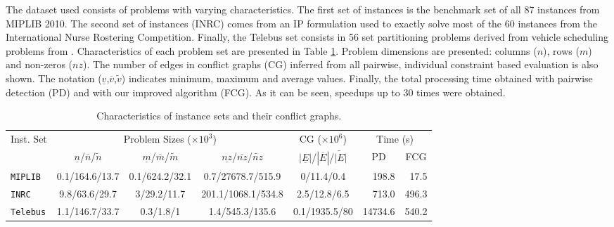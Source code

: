\documentclass{endm}
\begin{document}
The dataset used consists of problems with varying characteristics. The first set of instances is the benchmark set of all 87 instances from MIPLIB 2010\cite{miplib}. The second set of instances (INRC) comes from an IP formulation  used to exactly solve \cite{Santos2014} most of the 60 instances from the International Nurse Rostering Competition\cite{haspeslagh}. Finally, the Telebus set consists in 56 set partitioning problems derived from vehicle scheduling problems from \cite{Borndorfer1998}. Characteristics of each problem set are presented in Table \ref{tab:inst}. Problem dimensions are presented: columns ($n$), rows ($m$) and non-zeros ($nz$). The number of edges in conflict graphs (CG) inferred from all pairwise, individual constraint based evaluation is also shown. The notation ($\underline{v}$,$\overline{v}$,$\tilde{v}$) indicates minimum, maximum and average values. Finally, the total processing time obtained with pairwise detection (PD) and with our improved algorithm (FCG). As it can be seen, speedups up to 30 times were obtained.

\begin{table}[h]
\scriptsize
\caption{Characteristics of instance sets and their conflict graphs.}\label{tab:inst}
\begin{center}
\begin{tabular}{|l|c|c|c|c|r|r|}
\hline 
\multirow{2}{0.8cm}{Inst. Set} & \multicolumn{3}{c|}{{Problem Sizes ($\times10^{3}$)}} & {CG ($\times10^{6}$)} & \multicolumn{2}{c|}{{Time (s)}}\tabularnewline
\cline{2-7} 
 & {$\underline{n}$/$\overline{n}$/$\tilde{n}$} & {$\underline{m}$/$\overline{m}$/$\tilde{m}$} & {$\underline{nz}$/$\overline{nz}$/$\tilde{nz}$} & {$|\underline{E}|$/$|\overline{E}|$/$\tilde{|E|}$} & \multicolumn{1}{c|}{PD} & \multicolumn{1}{c|}{FCG}\tabularnewline
\hline 
\hline 
\texttt{MIPLIB} & {0.1/164.6/13.7} & {0.1/624.2/32.1} & {0.7/27678.7/515.9} & {0/11.4/0.4} & {198.8} & {17.5}\tabularnewline
\hline 
\texttt{INRC} & {9.8/63.6/29.7} & {3/29.2/11.7} & {201.1/1068.1/534.8} & {2.5/12.8/6.5} & {713.0} & {496.3}\tabularnewline
\hline 
\texttt{Telebus} & {1.1/146.7/33.7} & {0.3/1.8/1} & {1.4/545.3/135.6} & {0.1/1935.5/80} & {14734.6} & {540.2}\tabularnewline
\hline 
\end{tabular}
\end{center}
\end{table}
\end{document}

